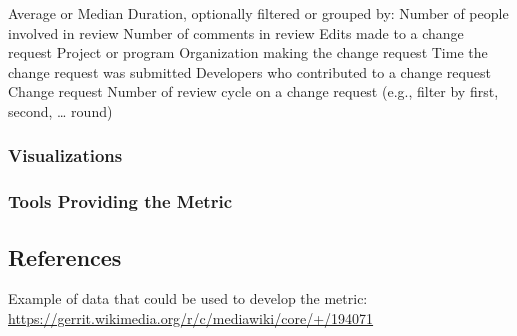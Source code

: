 Average or Median Duration, optionally filtered or grouped by: Number of
people involved in review Number of comments in review Edits made to a
change request Project or program Organization making the change request
Time the change request was submitted Developers who contributed to a
change request Change request Number of review cycle on a change request
(e.g., filter by first, second, \ldots{} round)

\hypertarget{visualizations}{%
\subsubsection{Visualizations}\label{visualizations}}

\hypertarget{tools-providing-the-metric}{%
\subsubsection{Tools Providing the
Metric}\label{tools-providing-the-metric}}

\hypertarget{references}{%
\subsection{References}\label{references}}

Example of data that could be used to develop the metric:
\url{https://gerrit.wikimedia.org/r/c/mediawiki/core/+/194071}
